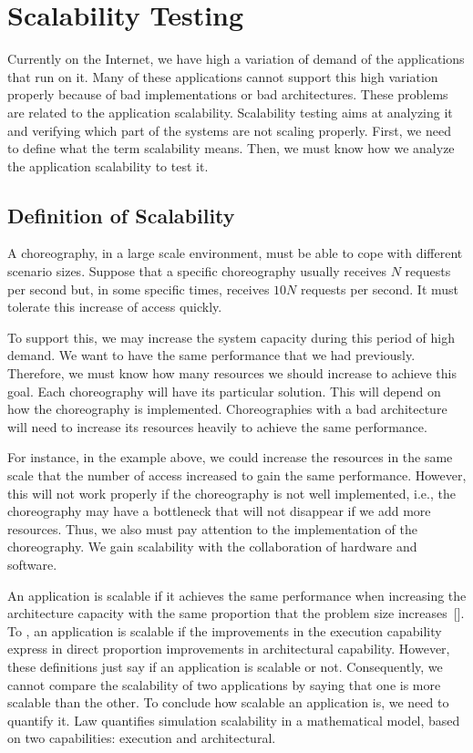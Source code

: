 \section{Scalability Testing}
\label{scalabilityTesting}

Currently on the Internet, we have high a variation of demand of the applications that run on it. Many of these applications cannot support this high variation properly because of bad implementations or bad architectures. These problems are related to the application scalability. Scalability testing aims at analyzing it and verifying which part of the systems are not scaling properly. First, we need to define what the term scalability means. Then, we must know how we analyze the application scalability to test it. 

\subsection{Definition of Scalability}
A choreography, in a large scale environment, must be able to cope with different scenario sizes. Suppose that a specific choreography usually receives $N$ requests per second but, in some specific times, receives $10N$ requests per second. It must tolerate this increase of access quickly.

To support this, we may increase the system capacity during this period of high demand. We want to have the same performance that we had previously. Therefore, we must know how many resources we should increase to achieve this goal.  Each choreography will have its particular solution. This will depend on how the choreography is implemented. Choreographies with a bad architecture will need to increase its resources heavily to achieve the same performance.

For instance, in the example above, we could increase the resources in the same scale that the number of access increased to gain the same performance. However, this will not work properly if the choreography is not well implemented, i.e.,  the choreography may have a bottleneck that will not disappear if we add more resources. Thus, we also must pay attention to the implementation of the choreography. We gain scalability with the collaboration of hardware and software. 

An application is scalable if it achieves the same performance when increasing the architecture capacity with the same proportion that the problem size increases~[\cite{QUINN}]. To \cite{LAW}, an application is scalable if the improvements in the execution capability express in direct proportion improvements in architectural capability. However, these definitions just say if an application is scalable or not. Consequently, we cannot compare the scalability of two applications by saying that one is more scalable than the other. To conclude how scalable an application is, we need to quantify it. Law quantifies simulation scalability in a mathematical model, based on two capabilities: execution and architectural. 

